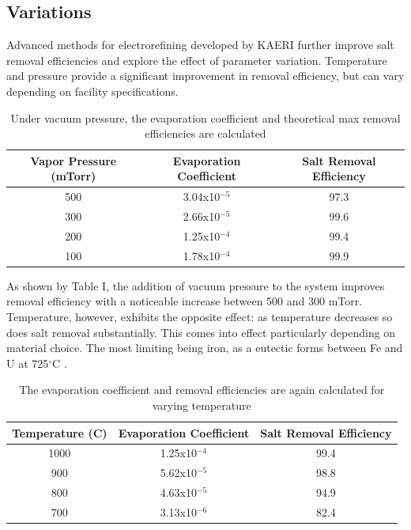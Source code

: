 \documentclass{anstrans}
\begin{document}
\subsection{Variations}

Advanced methods for electrorefining developed by KAERI \cite{lee_advanced_nodate} further improve salt removal efficiencies and explore the effect of parameter variation. Temperature and pressure provide a significant improvement in removal efficiency, but can vary depending on facility specifications. 

\begin{table}[h]
	\centering
	\begin{tabularx}{0.5\textwidth}{ccc}
		\hline
		\textbf{Vapor Pressure (mTorr)} & \textbf{Evaporation Coefficient} & \textbf{Salt Removal Efficiency} \\
		\hline
		500 & 3.04x10$^{-5}$ & 97.3 \\
		300 & 2.66x10$^{-5}$ & 99.6 \\
		200 & 1.25x10$^{-4}$ & 99.4 \\
		100 & 1.78x10$^{-4}$ & 99.9 \\
		\hline
	\end{tabularx}
	\caption {Under vacuum pressure, the evaporation coefficient and theoretical max removal efficiencies are calculated \cite{lee_advanced_nodate}}
	\label {tab:pressure}
\end{table}

As shown by Table I, the addition of vacuum pressure to the system improves removal efficiency with a noticeable increase between 500 and 300 mTorr. Temperature, however, exhibits the opposite effect: as temperature decreases so does salt removal substantially. This comes into effect particularly depending on material choice. The most limiting being iron, as a eutectic forms between Fe and U at 725$^{\circ}$C \cite{chapman_revision_1984}.

\begin{table}[h]
	\centering
	\begin{tabularx}{0.5\textwidth}{ccc}
		\hline
		\textbf{Temperature (C)} & \textbf{Evaporation Coefficient} & \textbf{Salt Removal Efficiency} \\
		\hline
		1000 & 1.25x10$^{-4}$ & 99.4 \\
		900 & 5.62x10$^{-5}$ & 98.8 \\
		800 & 4.63x10$^{-5}$ & 94.9 \\
		700 & 3.13x10$^{-6}$ & 82.4 \\
		\hline
	\end{tabularx}
	\caption {The evaporation coefficient and removal efficiencies are again calculated for varying temperature \cite{lee_advanced_nodate}}
	\label {tab:temperature}
\end{table}
\end{document}

